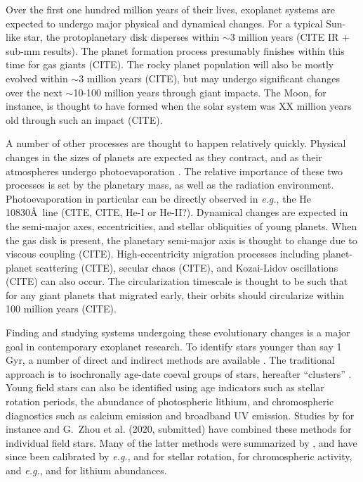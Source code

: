 \documentclass[12pt,twocolumn,tighten]{aastex62}
\begin{document}
Over the first one hundred million years of their lives, exoplanet
systems are expected to undergo major physical and dynamical changes.
For a typical Sun-like star, the protoplanetary disk disperses within
$\sim$3 million years (CITE IR + sub-mm results).  The planet
formation process presumably finishes within this time for gas giants
(CITE).  The rocky planet population will also be mostly evolved
within $\sim$3 million years (CITE), but may undergo significant
changes over the next $\sim$10-100 million years through giant
impacts.  The Moon, for instance, is thought to have formed when the
solar system was XX million years old through such an impact (CITE).

A number of other processes are thought to happen relatively quickly.
Physical changes in the sizes of planets are expected as they
contract, and as their atmospheres undergo photoevaporation
\citep[{\it
e.g.},][]{Fortney_et_al_2007,Owen_Wu_2013,Fulton_et_al_2017}.  The
relative importance of these two processes is set by the planetary
mass, as well as the radiation environment.  Photoevaporation in
particular can be directly observed in {\it e.g.}, the He 10830\AA\
line (CITE, CITE, He-I or He-II?).  Dynamical changes are expected in
the semi-major axes, eccentricities, and stellar obliquities of young
planets.  When the gas disk is present, the planetary semi-major axis
is thought to change due to viscous coupling (CITE).
High-eccentricity migration processes including planet-planet
scattering (CITE), secular chaos (CITE), and Kozai-Lidov oscillations
(CITE) can also occur.  The circularization timescale is thought to be
such that for any giant planets that migrated early, their orbits
should circularize within 100 million years (CITE).

Finding and studying systems undergoing these evolutionary changes is
a major goal in contemporary exoplanet research.  To identify stars
younger than say 1$\,$Gyr, a number of direct and indirect methods are
available \citep{soderblom_ages_2010}.  The traditional approach is to
isochronally age-date coeval groups of stars, hereafter ``clusters''
\citep[{\it
e.g.},][]{lada_embedded_2003,zuckerman_young_2004,krumholz_star_2019}.
Young field stars can also be identified using age indicators such as
stellar rotation periods, the abundance of photospheric lithium, and
chromospheric diagnostics such as calcium emission and broadband UV
emission.  Studies by for instance \citet{david_discovery_2018} and
G{.}~Zhou et al. (2020, submitted) have combined these methods for
individual field stars.  Many of the latter methods were summarized by
\citet{mamajek_improved_2008}, and have since been calibrated by {\it
e.g.},
\citet{barnes_color-period_2015,meibom_spin-down_2015,angus_calibrating_2015}
and \citet{curtis_tess_2019} for stellar rotation,
\citet{zerjal_chromospherically_2017} for chromospheric activity, and
{\it e.g.}, \citet{berger_identifying_2018} and
\citet{zerjal_galah_2019} for lithium abundances.
\end{document}
